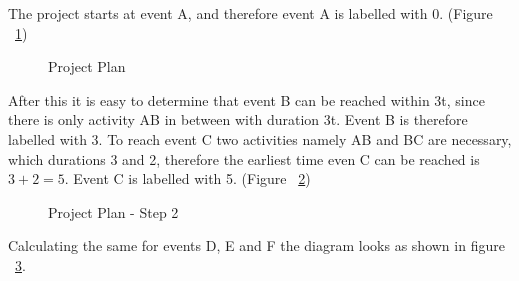The project starts at event A, and therefore event A is labelled with 0. (Figure ~\ref{pic:plan2})
\begin{figure}[h] 
\centerline{}
\label{pic:plan2}
\caption{Project Plan}
\end{figure}
After this it is easy to determine that event B can be reached within 3t, since there is only activity AB in between with duration 3t. Event B is therefore labelled with 3.
To reach event C two activities namely AB and BC are necessary, which durations 3 and 2, therefore the earliest time even C can be reached is $3+2 = 5$. Event C is labelled with 5. (Figure ~\ref{pic:plan3})
\begin{figure}[h] 
\centerline{}
\label{pic:plan3}
\caption{Project Plan - Step 2}
\end{figure}

Calculating the same for events D, E and F the diagram looks as shown in figure ~\ref{fig:plan4}.
\begin{figure}[h] 
\centerline{}
\label{fig:plan4}
\caption{}
\end{figure}

